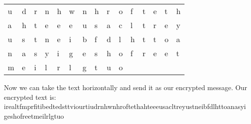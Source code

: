 \documentclass[14pt]{article}
\begin{document}
\begin{enumerate}[label=(\alph*)]
\begin{tabular}{ l l l l l l l l l l l l l l l}
u & d & r & n & h & w & n & h & r &  o & f & t & e & t & h\\
a & h & t & e & e & e & u & s & a & c & l & t & r & e & y\\
u & s & t & n & e & i & b & f & d & l & h & t & t & o & a\\
n & a & s & y & i & g & e & s & h & o & f & r & e & e & t\\
m & e & i & l & r & l & g & t & u & o\\
\end{tabular}
\newline
\newline
Now we can take the text horizontally and send it as our encrypted message. Our encrypted text is:
\newline
irealtfmprfitibedtedsttviourtiudrnhwnhroftethahteeeusacltreyustneibfdlhttoanasyigeshofreetmeilrlgtuo


\end{enumerate}
\end{document}
